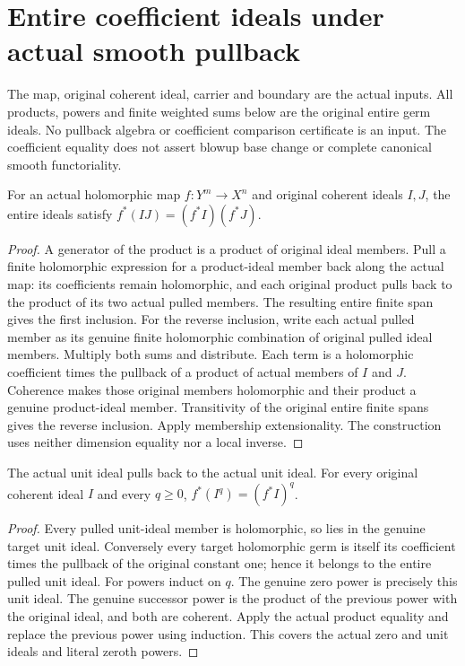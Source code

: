 \section{Entire coefficient ideals under actual smooth pullback}

The map, original coherent ideal, carrier and boundary are the actual inputs.
All products, powers and finite weighted sums below are the original entire
germ ideals. No pullback algebra or coefficient comparison certificate is an
input. The coefficient equality does not assert blowup base change or complete
canonical smooth functoriality.

\begin{lemma}\label{hir:crossdim-entire-product-pullback}
For an actual holomorphic map $f:Y^m\to X^n$ and original coherent ideals
$I,J$, the entire ideals satisfy $f^*(IJ)=(f^*I)(f^*J)$.
\leanok
\end{lemma}
\begin{proof}
A generator of the product is a product of original ideal members. Pull a
finite holomorphic expression for a product-ideal member back along the actual
map: its coefficients remain holomorphic, and each original product pulls
back to the product of its two actual pulled members. The resulting entire
finite span gives the first inclusion. For the reverse inclusion, write each
actual pulled member as its genuine finite holomorphic combination of original
pulled ideal members. Multiply both sums and distribute. Each term is a
holomorphic coefficient times the pullback of a product of actual members of
$I$ and $J$. Coherence makes those original members holomorphic and their
product a genuine product-ideal member. Transitivity of the original entire
finite spans gives the reverse inclusion. Apply membership extensionality.
The construction uses neither dimension equality nor a local inverse.
\end{proof}

\begin{lemma}\label{hir:crossdim-entire-unit-power-pullback}
The actual unit ideal pulls back to the actual unit ideal. For every original
coherent ideal $I$ and every $q\ge0$, $f^*(I^q)=(f^*I)^q$.
\leanok
{}
\end{lemma}
\begin{proof}
Every pulled unit-ideal member is holomorphic, so lies in the genuine target
unit ideal. Conversely every target holomorphic germ is itself its coefficient
times the pullback of the original constant one; hence it belongs to the
entire pulled unit ideal. For powers induct on $q$. The genuine zero power
is precisely this unit ideal. The genuine successor power is the product of
the previous power with the original ideal, and both are coherent. Apply the
actual product equality and replace the previous power using induction.
This covers the actual zero and unit ideals and literal zeroth powers.
\end{proof}


